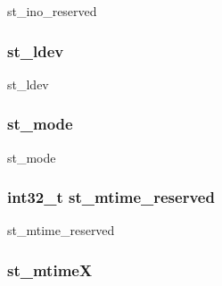 st\_\-ino\_\-reserved \hypertarget{structTru64__F64_1_1F64__stat_afe898922e87f9d30c656091edc140bc5}{
\subsubsection[{st\_\-ldev}]{ {\bf st\_\-ldev}}}
\label{structTru64__F64_1_1F64__stat_afe898922e87f9d30c656091edc140bc5}


st\_\-ldev \hypertarget{structTru64__F64_1_1F64__stat_aee5b542fc82f176aad79ec67feb729c8}{
\subsubsection[{st\_\-mode}]{ {\bf st\_\-mode}}}
\label{structTru64__F64_1_1F64__stat_aee5b542fc82f176aad79ec67feb729c8}


st\_\-mode \hypertarget{structTru64__F64_1_1F64__stat_ad8e87ee941a583e8193d5c18024b559f}{
\subsubsection[{st\_\-mtime\_\-reserved}]{\setlength{\rightskip}{0pt plus 5cm}int32\_\-t {\bf st\_\-mtime\_\-reserved}}}
\label{structTru64__F64_1_1F64__stat_ad8e87ee941a583e8193d5c18024b559f}


st\_\-mtime\_\-reserved \hypertarget{structTru64__F64_1_1F64__stat_a34d66c07fbc0daeae3195bf330321283}{
\subsubsection[{st\_\-mtimeX}]{ {\bf st\_\-mtimeX}}}
\label{structTru64__F64_1_1F64__stat_a34d66c07fbc0daeae3195bf330321283}


